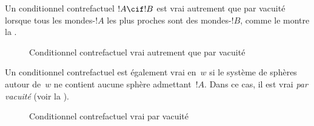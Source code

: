 \documentclass[../../../include/open-logic-section]{subfiles}
\begin{document}


Un conditionnel contrefactuel $!A \cif !B$ est vrai autrement que par
vacuité lorsque tous les mondes-$!A$ les plus proches sont des
mondes-$!B$, comme le montre la .
\begin{figure}
\begin{center}
\caption{Conditionnel contrefactuel vrai autrement que par vacuité}
\end{center}
\end{figure}
Un conditionnel contrefactuel est également vrai en~$w$ si le système
de sphères autour de~$w$ ne contient aucune sphère admettant~$!A$.
Dans ce cas, il est vrai \emph{par vacuité} (voir
la ).
\begin{figure}
\begin{center}
\caption{Conditionnel contrefactuel vrai par vacuité}
\end{center}
\end{figure}
\end{document}
